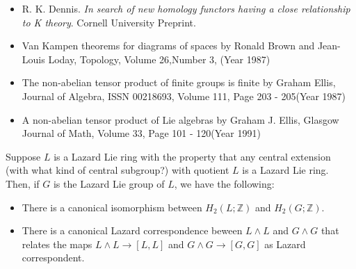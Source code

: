\begin{itemize}
\item R. K. Dennis. {\em In search of new homology functors having a
  close relationship to K theory}. Cornell University Preprint.
\item Van Kampen theorems for diagrams of spaces by Ronald Brown and
  Jean-Louis Loday, Topology, Volume 26,Number 3, (Year 1987)
\item The non-abelian tensor product of finite groups is finite by
  Graham Ellis, Journal of Algebra, ISSN 00218693, Volume 111, Page 203
  - 205(Year 1987)
\item A non-abelian tensor product of Lie algebras by Graham J. Ellis,
  Glasgow Journal of Math, Volume 33, Page 101 - 120(Year 1991)
\end{itemize}

\begin{lemma}
  Suppose $L$ is a Lazard Lie ring with the property that any central
  extension (with what kind of central subgroup?) with quotient $L$ is
  a Lazard Lie ring. Then, if $G$ is the Lazard Lie group of $L$, we
  have the following:

  \begin{itemize}
  \item There is a canonical isomorphism between $H_2(L;\mathbb{Z})$
    and $H_2(G;\mathbb{Z})$.
  \item There is a canonical Lazard correspondence beween $L \wedge
    L$ and $G \wedge G$ that relates the maps $L \wedge L \to [L,L]$
    and $G \wedge G \to [G,G]$ as Lazard correspondent.
  \end{itemize}  
\end{lemma}

